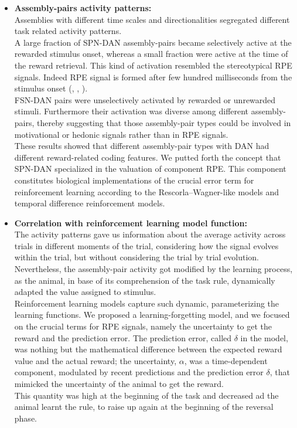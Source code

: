 \begin{itemize}
    \item \textbf{Assembly-pairs activity patterns:}\\
    Assemblies with different time scales and directionalities segregated different task related activity patterns.\\A large fraction of SPN-DAN assembly-pairs became selectively active at the rewarded stimulus onset, whereas a small fraction were active at the time of the reward retrieval. This kind of activation resembled the stereotypical RPE signals. Indeed RPE signal is formed after few hundred milliseconds from the stimulus onset (\cite{Tobler2003}, \cite{Nomoto2010}, \cite{Schultz2016}).\\FSN-DAN pairs were unselectively activated by rewarded or unrewarded stimuli. Furthermore their activation was diverse among different assembly-pairs, thereby suggesting that those assembly-pair types could be involved in motivational or hedonic signals rather than in RPE signals.\\These results showed that different assembly-pair types with DAN had different reward-related coding features. We putted forth the concept that SPN-DAN specialized in the valuation of component RPE. This component constitutes biological implementations of the crucial error term for reinforcement learning according to the Rescorla–Wagner-like models and temporal difference reinforcement models. 
    \item \textbf{Correlation with reinforcement learning model function:}\\The activity patterns gave us information about the average activity across trials in different moments of the trial, considering how the signal evolves within the trial, but without considering the trial by trial evolution. Nevertheless, the assembly-pair activity got modified by the learning process, as the animal, in base of its comprehension of the task rule, dynamically adapted the value assigned to stimulus.\\Reinforcement learning models capture such dynamic, parameterizing the learning functions. We proposed a learning-forgetting model, and we focused on the crucial terms for RPE signals, namely the uncertainty to get the reward and the prediction error. The prediction error, called $\delta$ in the model, was nothing but the mathematical difference between the expected reward value and the actual reward; the uncertainty, $\alpha$, was a time-dependent component, modulated by recent predictions and the prediction error $\delta$, that mimicked the uncertainty of the animal to get the reward.\\This quantity was high at the beginning of the task and decreased ad the animal learnt the rule, to raise up again at the beginning of the reversal phase.%

\end{itemize}
